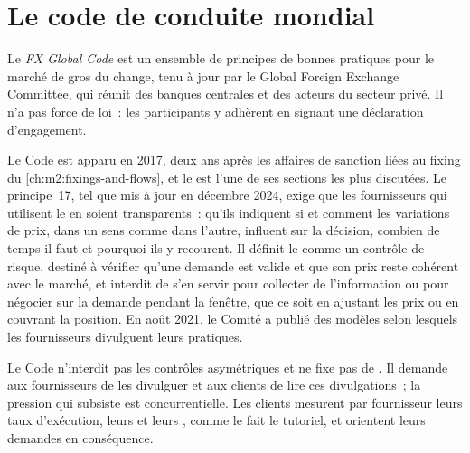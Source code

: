 \section{Le code de conduite mondial}

\begin{definition}\label{def:m2:fx-spot-microstructure:code}
Le \emph{FX Global Code} est un ensemble de principes de bonnes
pratiques pour le marché de gros du change, tenu à jour par le Global Foreign Exchange
Committee, qui réunit des banques centrales et des acteurs du secteur privé. Il n'a pas force de loi~:
les participants y adhèrent en signant une déclaration d'engagement.
\end{definition}

Le Code est apparu en 2017, deux ans après les affaires de sanction liées au
fixing du \cref{ch:m2:fixings-and-flows}, et le  est l'une de ses sections les plus
discutées. Le principe~17, tel que mis à jour en
décembre 2024, exige que les fournisseurs qui utilisent le  en soient transparents~:
qu'ils indiquent si et comment les variations de prix, dans un sens comme dans l'autre, influent sur la décision,
combien de temps il faut et pourquoi ils y recourent. Il définit le  comme un contrôle de risque, destiné à
vérifier qu'une demande est valide et que son prix reste cohérent avec le
marché, et interdit de s'en servir pour collecter de l'information ou pour négocier sur la demande
pendant la fenêtre, que ce soit en ajustant les prix ou en couvrant la position. En août 2021,
le Comité a publié des modèles selon lesquels les fournisseurs divulguent leurs pratiques.

\begin{remark}\label{rem:m2:fx-spot-microstructure:open}
Le Code n'interdit pas les contrôles asymétriques et ne fixe pas de . Il demande
aux fournisseurs de les divulguer et aux clients de lire ces divulgations~; la pression
qui subsiste est concurrentielle. Les clients mesurent par fournisseur leurs taux d'exécution, leurs  et leurs , comme le fait le tutoriel, et orientent leurs demandes
en conséquence.
\end{remark}

